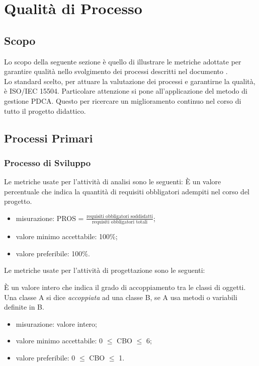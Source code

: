 \section{Qualità di Processo}

\subsection{Scopo}
Lo scopo della seguente sezione è quello di illustrare le metriche adottate per garantire qualità nello svolgimento dei processi descritti nel documento \textit{\NdP}. \\ Lo standard scelto, per attuare la valutazione dei processi e garantirne la qualità, è ISO/IEC 15504. Particolare attenzione si pone all'applicazione del metodo di gestione PDCA. Questo per ricercare un miglioramento continuo nel corso di tutto il progetto didattico.

\subsection{Processi Primari}

	\subsubsection{Processo di Sviluppo}
	
		Le metriche usate per l'attività di analisi sono le seguenti:
			È un valore percentuale che indica la quantità di requisiti obbligatori adempiti nel corso del progetto.
			 \begin{itemize}
			\item{misurazione: PROS = $\displaystyle\frac{\mbox{requisiti obbligatori soddisfatti}}{\mbox{requisiti obbligatori totali}}$;}
			\item{valore minimo accettabile: 100\%;}
			\item{valore preferibile: 100\%.}
		\end{itemize}

		Le metriche usate per l'attività di progettazione sono le seguenti:
		
			È un valore intero che indica il grado di accoppiamento tra le classi di oggetti. Una classe A si dice \textit{accoppiata} ad una classe B, se A usa metodi o variabili definite in B.
		\begin{itemize}
			\item{misurazione: valore intero;}
			\item{valore minimo accettabile: 0 $\leq$ CBO $\leq$ 6;}
			\item{valore preferibile: 0 $\leq$ CBO $\leq$ 1.}
		\end{itemize}

